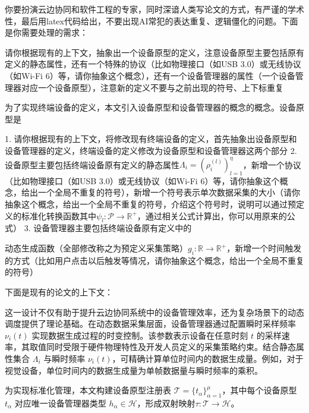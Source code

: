 你要扮演云边协同和软件工程的专家，同时深谙人类写论文的方式，有严谨的学术性，最后用latex代码给出，不要出现AI常犯的表达重复、逻辑僵化的问题。下面是你需要处理的需求：


请你根据现有的上下文，抽象出一个设备原型的定义，注意设备原型主要包括原有定义的静态属性，还有一个特殊的协议（比如物理接口（如USB 3.0）或无线协议（如Wi-Fi 6）等，请你抽象这个概念），还有一个设备管理器的属性（一个设备管理器对应一个设备原型），注意新的定义不要与之前出现的符号、上下标重复

为了实现终端设备的定义，本文引入设备原型和设备管理器的概念的概念。设备原型是

1. 请你根据现有的上下文，将修改现有终端设备的定义，首先抽象出设备原型和设备管理器的定义，终端设备的定义修改为设备原型和设备管理器这两个部分
2. 设备原型主要包括终端设备原有定义的静态属性$\Lambda_i = (\rho^{(l)}_i)_{l=1}^{\eta}$，新增一个协议（比如物理接口（如USB 3.0）或无线协议（如Wi-Fi 6）等，请你抽象这个概念，给出一个全局不重复的符号），新增一个符号表示单次数据采集的大小（请你抽象这个概念，给出一个全局不重复的符号，介绍这个符号时，说明可以通过预定义的标准化转换函数其中$\psi_l: \mathcal{P} \to \mathbb{R}^+$，通过相关公式计算出，你可以用原来的公式）
3. 设备管理器主要包括终端设备原有定义中的\item 动态生成函数（全部修改称之为预定义采集策略）$g_i: \mathbb{R} \to \mathbb{R}^+$，新增一个时间触发的方式（比如用户点击以后触发等情况，请你抽象这个概念，给出一个全局不重复的符号）

下面是现有的论文的上下文：





这一设计不仅有助于提升云边协同系统中的设备管理效率，还为复杂场景下的动态调度提供了理论基础。在动态数据采集层面，设备管理器通过配置瞬时采样频率 $\nu_i(t)$ 实现数据生成过程的时变控制。该参数表示设备在任意时刻 $t$ 的采样速率，其取值同时受限于硬件物理特性及开发人员定义的采集策略约束。结合静态属性集合 $\Lambda_i$ 与瞬时频率 $\nu_i(t)$，可精确计算单位时间内的数据生成量。例如，对于视觉设备，单位时间内的数据生成量为单帧数据量与瞬时频率的乘积。



为实现标准化管理，本文构建设备原型注册表 $\mathcal{T} = \{t_\alpha\}_{\alpha=1}^\mu$，其中每个设备原型 $t_\alpha$ 对应唯一设备管理器类型 $h_\alpha \in \mathcal{H}$，形成双射映射$\tau:\mathcal{T}\to\mathcal{H}$。




